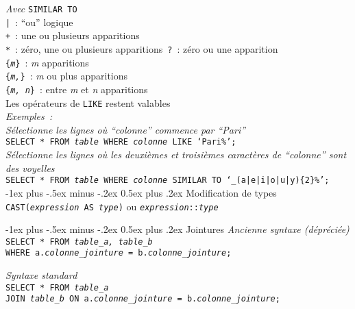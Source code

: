 \documentclass[10pt,landscape, a4paper]{article}
\makeatletter
\renewcommand{\section}{\@startsection{section}{1}{0mm}%
                                {-1ex plus -.5ex minus -.2ex}%
                                {0.5ex plus .2ex}%
                                {\normalfont\large\bfseries}}
\makeatother
\begin{document}
\begin{multicols}{3}
 \hspace{0.25em} {\scriptsize \emph{Avec} \texttt{SIMILAR TO}} \\
 \texttt{|}~: ``ou'' logique\\ 
 \texttt{+}~: une ou plusieurs apparitions\\
 \texttt{*}~: zéro, une ou plusieurs apparitions\
 \texttt{?}~: zéro ou une apparition\\
 \texttt{\{\emph{m}\}}~: \emph{m} apparitions\\
 \texttt{\{\emph{m,}\}}~: \emph{m} ou plus apparitions\\
 \texttt{\{\emph{m, n}\}}~: entre \emph{m} et \emph{n} apparitions\\
  Les opérateurs de \texttt{LIKE} restent valables\\ 
  
\emph{Exemples~:}\\
 \hspace{0.25em} {\scriptsize \emph{Sélectionne les lignes où \emph{``colonne''} commence par \emph{``Pari''}}} \\
{\scriptsize  \texttt{SELECT * FROM \emph{table} WHERE \emph{colonne} LIKE `Pari\%';}} \\

 \hspace{0.25em} {\scriptsize \emph{Sélectionne les lignes où les deuxièmes et troisièmes caractères de \emph{``colonne''} sont des voyelles}} \\
{\scriptsize  \texttt{SELECT * FROM \emph{table} WHERE \emph{colonne} SIMILAR TO `\_(a|e|i|o|u|y)\{2\}\%';}} \\

\section{Modification de types}
 \texttt{CAST(\emph{expression} AS \emph{type})} {\scriptsize ou}  \texttt{\emph{expression}\texttt{::}\emph{type}}

\section{Jointures}
 \hspace{0.25em} {\scriptsize \emph{Ancienne syntaxe (dépréciée)}} \\
\texttt{SELECT * FROM \emph{table\_a, table\_b} \\ 
WHERE a.\emph{colonne\_jointure} = b.\emph{colonne\_jointure};}

 \hspace{0.25em} {\scriptsize \emph{Syntaxe standard}} \\
\texttt{SELECT * FROM \emph{table\_a} \\ JOIN \emph{table\_b} ON a.\emph{colonne\_jointure} = b.\emph{colonne\_jointure};}


\end{multicols}
\end{document}
